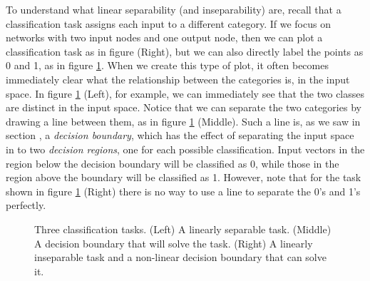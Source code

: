 To understand what linear separability (and inseparability) are, recall that a classification task assigns each input to a different category. If we focus on networks with two input nodes and one output node, then we can plot a classification task as in figure  (Right), but we can also directly label the points as 0 and 1, as in figure \ref{F:decisionBoundaries}. When we create this type of plot, it often becomes immediately clear what the relationship between the categories is, in the input space. In figure \ref{F:decisionBoundaries} (Left), for example, we can immediately see that the two classes are distinct in the input space. Notice that we can separate the two categories by drawing a line between them, as in figure \ref{F:decisionBoundaries} (Middle). Such a line is, as we saw in section , a \emph{decision boundary}, which has the effect of separating the input space in to two \emph{decision regions}, one for each possible classification. Input vectors in the region below the decision boundary will be classified as 0, while those in the region above the boundary will be classified as 1. However, note that for the task shown in figure \ref{F:decisionBoundaries} (Right) there is no way to use a line to separate the 0's and 1's perfectly.

\begin{figure}[h]
\centering
{}
\hspace*{.4in}
\hspace*{.4in}
\caption[Jeff Yoshimi.]{Three classification tasks. (Left) A linearly separable task. (Middle) A decision boundary that will solve the task. (Right) A linearly inseparable task and a non-linear decision boundary that can solve it.}
\label{F:decisionBoundaries}
\end{figure}


